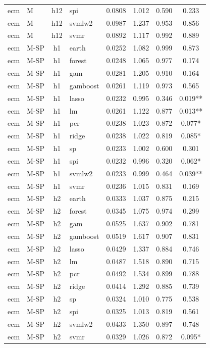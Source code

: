 \begin{ThreePartTable}
\begin{longtable}[t]{llclcccc}
ecm & M & h12 & spi & 0.0808 & 1.012 & 0.590 & 0.233\\
ecm & M & h12 & svmlw2 & 0.0987 & 1.237 & 0.953 & 0.856\\
ecm & M & h12 & svmr & 0.0892 & 1.117 & 0.992 & 0.889\\
\addlinespace
ecm & M-SP & h1 & earth & 0.0252 & 1.082 & 0.999 & 0.873\\
ecm & M-SP & h1 & forest & 0.0248 & 1.065 & 0.977 & 0.174\\
ecm & M-SP & h1 & gam & 0.0281 & 1.205 & 0.910 & 0.164\\
ecm & M-SP & h1 & gamboost & 0.0261 & 1.119 & 0.973 & 0.565\\
ecm & M-SP & h1 & lasso & 0.0232 & 0.995 & 0.346 & 0.019**\\
ecm & M-SP & h1 & lm & 0.0261 & 1.122 & 0.877 & 0.013**\\
ecm & M-SP & h1 & pcr & 0.0238 & 1.023 & 0.872 & 0.077*\\
ecm & M-SP & h1 & ridge & 0.0238 & 1.022 & 0.819 & 0.085*\\
ecm & M-SP & h1 & sp & 0.0233 & 1.002 & 0.600 & 0.301\\
ecm & M-SP & h1 & spi & 0.0232 & 0.996 & 0.320 & 0.062*\\
ecm & M-SP & h1 & svmlw2 & 0.0233 & 0.999 & 0.464 & 0.039**\\
ecm & M-SP & h1 & svmr & 0.0236 & 1.015 & 0.831 & 0.169\\
\addlinespace
ecm & M-SP & h2 & earth & 0.0333 & 1.037 & 0.875 & 0.215\\
ecm & M-SP & h2 & forest & 0.0345 & 1.075 & 0.974 & 0.299\\
ecm & M-SP & h2 & gam & 0.0525 & 1.637 & 0.902 & 0.781\\
ecm & M-SP & h2 & gamboost & 0.0519 & 1.617 & 0.907 & 0.831\\
ecm & M-SP & h2 & lasso & 0.0429 & 1.337 & 0.884 & 0.746\\
ecm & M-SP & h2 & lm & 0.0487 & 1.518 & 0.890 & 0.715\\
ecm & M-SP & h2 & pcr & 0.0492 & 1.534 & 0.899 & 0.788\\
ecm & M-SP & h2 & ridge & 0.0414 & 1.292 & 0.885 & 0.739\\
ecm & M-SP & h2 & sp & 0.0324 & 1.010 & 0.775 & 0.538\\
ecm & M-SP & h2 & spi & 0.0325 & 1.013 & 0.819 & 0.561\\
ecm & M-SP & h2 & svmlw2 & 0.0433 & 1.350 & 0.897 & 0.748\\
ecm & M-SP & h2 & svmr & 0.0329 & 1.026 & 0.872 & 0.095*\\

\end{longtable}
\end{ThreePartTable}
